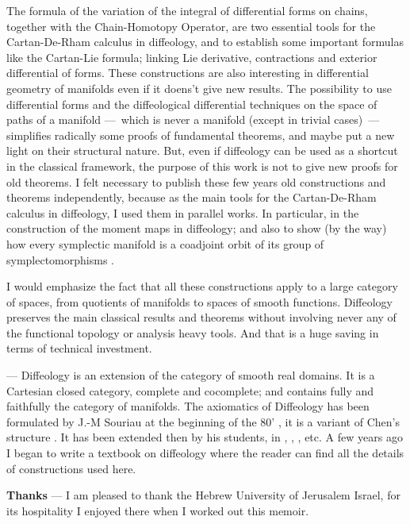 \documentclass[11pt,reqno]{amsart}
\theoremstyle{definition}
\begin{document}
	\begin{text}
    The formula of the
    variation of the integral of differential forms on chains,
    together with the Chain-Homotopy Operator,
    are two essential tools for the Cartan-De-Rham
    calculus in diffeology, and to establish some
    important formulas like the Cartan-Lie formula; linking
    Lie derivative, contractions and exterior differential of
    forms. These
    constructions are also interesting in
    differential geometry of manifolds even if it doens't
    give new results. The
    possibility to use differential forms and the diffeological differential
    techniques on the space of paths
    of a manifold ---~which is never a manifold (except in
    trivial cases)~--- simplifies radically some proofs of
    fundamental theorems, and maybe put a new
    light on their structural nature.
    But, even if diffeology can be used as a shortcut in the classical framework, 
    the purpose of this work is not to give new proofs
    for old theorems. I felt necessary to
    publish these few years old constructions and theorems independently,
    because as the main tools for the Cartan-De-Rham calculus in
    diffeology, I used them in parallel works. In particular, in the construction 
    of the moment maps in diffeology; and also to show (by the way) how 
    every symplectic manifold is a
    coadjoint orbit of its group of
    symplectomorphisms \cite{Piz07}.    
    
     I would emphasize the fact that all these constructions apply to a 
     large category of spaces, from quotients of manifolds to spaces of smooth functions. 
     Diffeology preserves the main classical results and theorems without involving never any
     of the functional topology or analysis heavy tools. And that is a huge saving 
     in terms of technical investment.
    
     --- Diffeology is an extension of the category of
    smooth real domains. It is a Cartesian closed category, complete and cocomplete; 
    and contains fully and faithfully the category of manifolds. The axiomatics of Diffeology has
    been formulated by J.-M Souriau at the beginning of the
    80' \cite{Sou81}, it is a variant of
    Chen's structure \cite{Che77}. It has been extended then by his students, in
    \cite{Don84}, \cite{DI85}, \cite{Igl85}, etc.
    A few years ago I began to write a textbook on diffeology \cite{Piz05} where the reader
    can find all the details of constructions used here.
    
    \bigskip
    {\bf Thanks} --- I am pleased to thank the Hebrew
    University of Jerusalem Israel, for its hospitality 
    I enjoyed there when I worked out this memoir.
	\end{text}	
	
\end{document}

